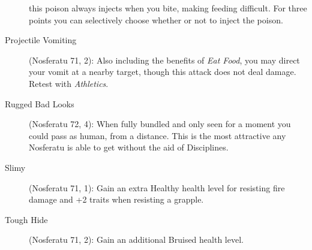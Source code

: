 \begin{description}
	this poison always injects when you bite, making feeding difficult.  For three points 
	you can selectively choose whether or not to inject the poison.
	\item[Projectile Vomiting] (Nosferatu 71, 2):  Also including the benefits of 
	\emph{Eat Food}, you may direct your vomit at a nearby target, though this attack 
	does not deal damage.  Retest with \emph{Athletics}.
	\item[Rugged Bad Looks] (Nosferatu 72, 4):  When fully bundled and only seen 
	for a moment you could pass as human, from a distance.  This is the most attractive 
	any Nosferatu is able to get without the aid of Disciplines.
	\item[Slimy] (Nosferatu 71, 1):  Gain an extra Healthy health level for resisting 
	fire damage and +2 traits when resisting a grapple.
	\item[Tough Hide] (Nosferatu 71, 2):  Gain an additional Bruised health level.
\end{description}

